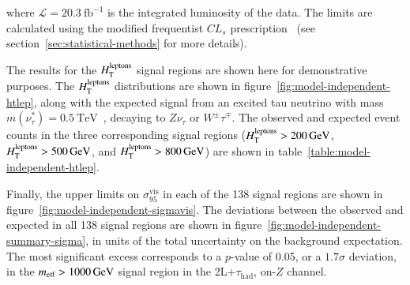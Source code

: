 where $\mathcal{L}=20.3~\mbox{fb}^{-1}$ is the integrated luminosity of the data. The limits are calculated using the modified frequentist $CL_s$ prescription~\cite{cls} (see section~\ref{sec:statistical-methods} for more details). 

The results for the $H_{\mathrm{T}}^{\mathrm{leptons}}$ signal regions are shown here for demonstrative purposes. 
The $H_{\mathrm{T}}^{\mathrm{leptons}}$ distributions are shown in figure~\ref{fig:model-independent-htlep}, along with the expected signal from an excited tau neutrino with mass $m(\nu^*_{\tau})=\SI{0.5}{\tera\electronvolt}$~\cite{excited-neutrino}, decaying to $Z\nu_{\tau}$ or $W^{\pm}\tau^{\mp}$. The observed and expected event counts in the three corresponding signal regions ($H_{\mathrm{T}}^{\mathrm{leptons}}>\SI{200}{\giga\electronvolt}$, $H_{\mathrm{T}}^{\mathrm{leptons}}>\SI{500}{\giga\electronvolt}$, and $H_{\mathrm{T}}^{\mathrm{leptons}}>\SI{800}{\giga\electronvolt}$) are shown in table~\ref{table:model-independent-htlep}. 

Finally, the upper limits on $\sigma_{95}^{\mathrm{vis}}$ in each of the 138 signal regions are shown in figure~\ref{fig:model-independent-sigmavis}. The deviations between the observed and expected in all 138 signal regions are shown in figure~\ref{fig:model-independent-summary-sigma}, in units of the total uncertainty on the background expectation. The most significant excess corresponds to a $p$-value of 0.05, or a $1.7\sigma$ deviation, in the $m_{\mathrm{eff}}>\SI{1000}{\giga\electronvolt}$ signal region in the 2L$+\tau_{\mathrm{had}}$, on-$Z$ channel. 

